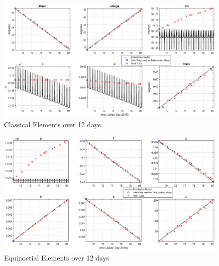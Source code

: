 \documentclass[Space3_Assign1.tex]{subfiles}
\begin{document}
\begin{figure}[h!]
\centering
\caption{Classical Elements over 12 days}
\label{fig:Q2classical_overtime}
\includegraphics[trim = {3cm 0 3cm 0},clip,width=1\linewidth]{Q2classical_overtime.eps}
\end{figure}
\begin{figure}[h!]
\centering
\caption{Equinoctial Elements over 12 days}
\label{fig:Q2equinoctial_overtime}
\includegraphics[trim = {3cm 0 3cm 0},clip,width=1\linewidth]{Q2equinoctial_overtime.eps}
\end{figure}
\end{document}
